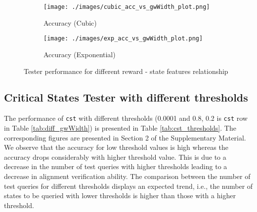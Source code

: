 \begin{figure}[!hbtp]
     \centering
     \begin{subfigure}[b]{0.35\textwidth}
         \centering
         \texttt{[image: ./images/cubic\_acc\_vs\_gwWidth\_plot.png]}
         \caption{Accuracy (Cubic)}
         \label{fig:cubic_acc_vs_features_plot}
     \end{subfigure}
    \hspace{5mm}
     \begin{subfigure}[b]{0.35\textwidth}
         \centering
         \texttt{[image: ./images/exp\_acc\_vs\_gwWidth\_plot.png]}
         \caption{Accuracy (Exponential)}
         \label{fig:exp_acc_vs_features_plot}
     \end{subfigure}
    \caption{Tester performance for different reward - state features relationship}
    \label{fig:feature_types}
\end{figure}
\subsection{Critical States Tester with different thresholds}
\label{subsec:cst-thresholds}
The performance of \texttt{cst} with different thresholds (0.0001 and 0.8, 0.2 is \texttt{cst} row in Table \ref{tab:diff_gwWidth}) is presented in Table \ref{tab:cst_thresholds}. The corresponding figures are presented in Section 2 of the Supplementary Material. We observe that the accuracy for low threshold values is high whereas the accuracy drops considerably with higher threshold value. This is due to a decrease in the number of test queries with higher thresholds leading to a decrease in alignment verification ability. The comparison between the number of test queries for different thresholds displays an expected trend, i.e., the number of states to be queried with lower thresholds is higher than those with a higher threshold.

